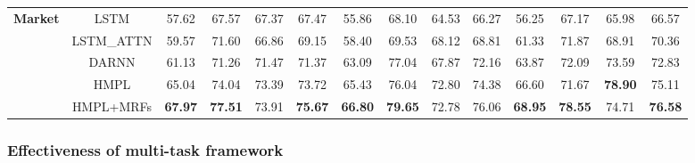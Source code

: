 \documentclass[sigconf,anonymous,review]{acmart}
\begin{document}
\begin{table}[t]
\begin{tabular}{@{}cccccccccccccc@{}}
\multirow{5}{*}{\textbf{Market}}    & LSTM                            & 57.62                      & 67.57          & 67.37          & 67.47                      & 55.86          & 68.10          & 64.53          & 66.27                               & 56.25          & 67.17          & 65.98          & 66.57          \\
                           & \multicolumn{1}{c|}{LSTM\_ATTN} & 59.57                      & 71.60          & 66.86          & \multicolumn{1}{c|}{69.15} & 58.40          & 69.53          & 68.12          & \multicolumn{1}{c|}{68.81}          & 61.33          & 71.87          & 68.91          & 70.36          \\
                           & \multicolumn{1}{c|}{DARNN}      & 61.13                      & 71.26          & 71.47          & \multicolumn{1}{c|}{71.37} & 63.09          & 77.04          & 67.87          & \multicolumn{1}{c|}{72.16}          & 63.87          & 72.09          & 73.59          & 72.83          \\
                           & \multicolumn{1}{c|}{HMPL}       & 65.04                      & 74.04          & 73.39          & \multicolumn{1}{c|}{73.72} & 65.43          & 76.04          & 72.80 & \multicolumn{1}{c|}{74.38} & 66.60          & 71.67          & \textbf{78.90} & 75.11          \\
                           & HMPL+MRFs                       & \textbf{67.97}             & \textbf{77.51} & 73.91          & \textbf{75.67}             & \textbf{66.80} & \textbf{79.65} & 72.78          & 76.06                               & \textbf{68.95} & \textbf{78.55} & 74.71          & \textbf{76.58} \\ \bottomrule
\end{tabular}
\label{tab:result}
\end{table}

\subsubsection{Effectiveness of multi-task framework}
\end{document}
